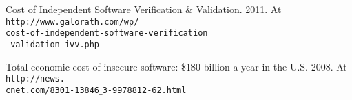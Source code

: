 \documentclass[a4paper,11pt]{article}
\begin{document}



\vspace{-0.15in}



{%





\begin{thebibliography}{}



\vspace*{-0.25in}



\setlength{\parindent}{0pt}

\setlength{\columnsep}{0.3in}

\setlength{\parskip}{-0.1ex}



\begin{multicols}{2}



Cost of Independent Software Verification \&
Validation. 2011. At {\tt http://www.galorath.com/wp/}\\
{\tt cost-of-independent-software-verification}\\
{\tt -validation-ivv.php}



Total economic cost of insecure software: \$180 billion a year in the
U.S. 2008. At {\tt http://news.}\\
{\tt cnet.com/8301-13846$\_$3-9978812-62.html}





\end{multicols}

\end{thebibliography}



}
\end{document}
